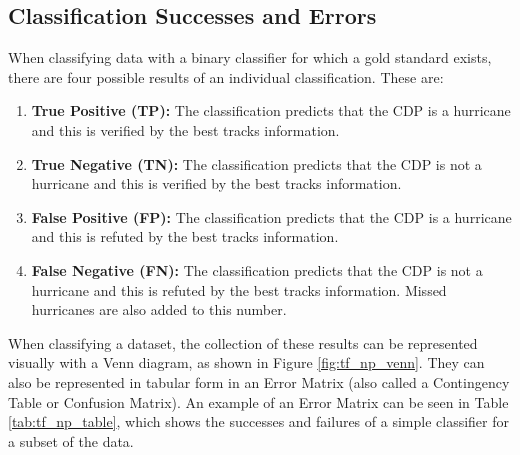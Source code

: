 \documentclass[pdftex,12pt,a4paper]{report}
\begin{document}
\subsection{Classification Successes and Errors}
\label{sec:cla_successes_and_errors}

When classifying data with a binary classifier for which a gold standard exists, there are four
possible results of an individual classification. These are:

\begin{enumerate}
    \item \textbf{True Positive (TP):} The classification predicts that the CDP is a hurricane and
        this is verified by the best tracks information.
    \item \textbf{True Negative (TN):} The classification predicts that the CDP is not a hurricane
        and this is verified by the best tracks information.
    \item \textbf{False Positive (FP):} The classification predicts that the CDP is a hurricane and
        this is refuted by the best tracks information.
    \item \textbf{False Negative (FN):} The classification predicts that the CDP is not a hurricane
        and this is refuted by the best tracks information. Missed hurricanes are also added to this
        number.
\end{enumerate}

When classifying a dataset, the collection of these results can be represented visually with a Venn
diagram, as shown in Figure \ref{fig:tf_np_venn}. They can also be represented in tabular form in an
Error Matrix (also called a Contingency Table or Confusion Matrix). An example of an Error Matrix
can be seen in Table \ref{tab:tf_np_table}, which shows the successes and failures of a simple
classifier for a subset of the data.
\end{document}
